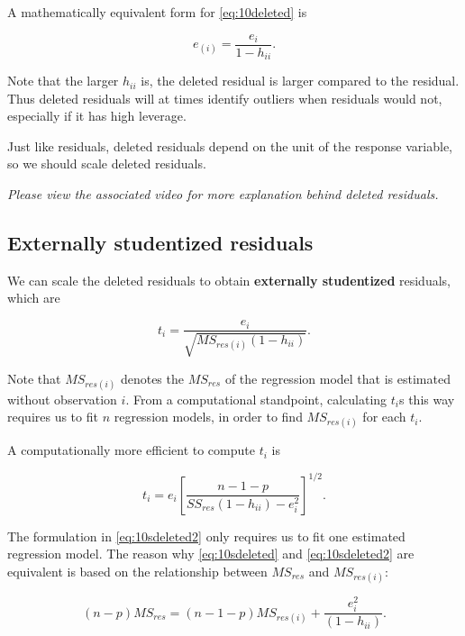 \documentclass[
]{book}
\begin{document}
A mathematically equivalent form for \eqref{eq:10deleted} is

\begin{equation} 
e_{(i)} = \frac{e_i}{1-h_{ii}}.
\label{eq:10deleted2}
\end{equation}

Note that the larger \(h_{ii}\) is, the deleted residual is larger compared to the residual. Thus deleted residuals will at times identify outliers when residuals would not, especially if it has high leverage.

Just like residuals, deleted residuals depend on the unit of the response variable, so we should scale deleted residuals.

\emph{Please view the associated video for more explanation behind deleted residuals.}

\hypertarget{externally-studentized-residuals}{%
\subsection{Externally studentized residuals}\label{externally-studentized-residuals}}

We can scale the deleted residuals to obtain \textbf{externally studentized} residuals, which are

\begin{equation} 
t_i = \frac{e_i}{\sqrt{MS_{res(i)}(1-h_{ii})}}.
\label{eq:10sdeleted}
\end{equation}

Note that \(MS_{res(i)}\) denotes the \(MS_{res}\) of the regression model that is estimated without observation \(i\). From a computational standpoint, calculating \(t_i\)s this way requires us to fit \(n\) regression models, in order to find \(MS_{res(i)}\) for each \(t_i\).

A computationally more efficient to compute \(t_i\) is

\begin{equation} 
t_i =
e_i\left[\frac{n-1-p}{SS_{res}(1-h_{ii})-e_i^2}\right]^{1/2}.
\label{eq:10sdeleted2}
\end{equation}

The formulation in \eqref{eq:10sdeleted2} only requires us to fit one estimated regression model. The reason why \eqref{eq:10sdeleted} and \eqref{eq:10sdeleted2} are equivalent is based on the relationship between \(MS_{res}\) and \(MS_{res(i)}\):

\begin{equation} 
(n-p)MS_{res}=(n-1-p)MS_{res(i)} + \frac{e_i^2}{(1-h_{ii})}.
\label{eq:10relate}
\end{equation}
\end{document}
